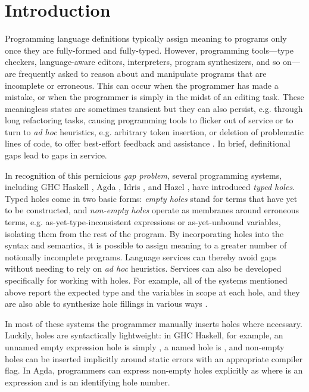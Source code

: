 \section{Introduction}
\label{sec:intro}

Programming language definitions typically assign meaning to programs only once they are fully-formed and fully-typed. 
However, programming tools---type checkers, language-aware editors, interpreters, program synthesizers, and so on---%
are frequently asked to reason about and manipulate programs that are incomplete or erroneous.
This can occur when the programmer has made a mistake, or when the programmer is simply in the midst of an editing task.
These meaningless states are sometimes transient but they can also persist, e.g. through long refactoring tasks, causing programming tools to flicker out of service or to turn to  
\emph{ad hoc} heuristics, e.g. arbitrary token insertion, or deletion of problematic lines of code, to offer best-effort feedback and assistance \cite{HazelnutSNAPL, DBLP:conf/oopsla/KatsJNV09,DBLP:journals/pacmpl/BourRS18}.
In brief, definitional gaps lead to gaps in service.

In recognition of this pernicious \emph{gap problem}, several programming systems, 
including GHC Haskell \cite{GHCHoles}, Agda \cite{norell:thesis}, Idris \cite{brady2013idris}, and Hazel \cite{DBLP:conf/popl/OmarVHAH17,DBLP:journals/pacmpl/OmarVCH19}, have introduced \emph{typed holes}. Typed holes come in two basic forms: \emph{empty holes} 
stand for terms that have yet to be constructed, and 
\emph{non-empty holes} 
operate as membranes around erroneous terms, e.g. as-yet-type-inconsistent
expressions or as-yet-unbound variables, 
isolating them from the rest of the program.
By incorporating holes into the syntax and semantics, 
it is possible to assign meaning to a greater number of notionally incomplete programs.
Language services can thereby avoid gaps without needing to rely on \emph{ad hoc} heuristics.
Services can also be developed specifically for working with holes. For example, all of the systems mentioned above report  
the expected type and the variables in scope at each hole, and they are also able to synthesize hole fillings in various ways \cite{DBLP:conf/haskell/Gissurarson18,DBLP:journals/pacmpl/LubinCOC20}.

In most of these systems the programmer manually inserts holes where necessary.
Luckily, holes are syntactically lightweight: in GHC Haskell, for example, an unnamed empty expression
hole is simply \li{_}, a named hole is , and non-empty holes can be inserted implicitly around static errors with an appropriate compiler flag. 
In Agda, programmers can express  
non-empty holes explicitly as  where  is an expression and  is an identifying hole number.

